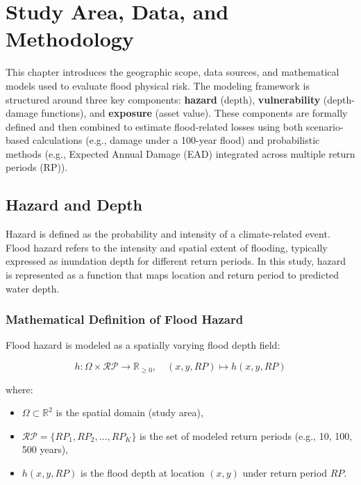 \chapter{Study Area, Data, and Methodology}

This chapter introduces the geographic scope, data sources, and mathematical models used to evaluate flood physical risk. The modeling framework is structured around three key components: \textbf{hazard} (depth), \textbf{vulnerability} (depth-damage functions), and \textbf{exposure} (asset value). These components are formally defined and then combined to estimate flood-related losses using both scenario-based calculations (e.g., damage under a 100-year flood) and probabilistic methods (e.g., Expected Annual Damage (EAD) integrated across multiple return periods (RP)).


\section{Hazard and Depth}
Hazard is defined as the probability and intensity of a climate-related event. Flood hazard refers to the intensity and spatial extent of flooding, typically expressed as inundation depth for different return periods. In this study, hazard is represented as a function that maps location and return period to predicted water depth.

\subsection{Mathematical Definition of Flood Hazard}

Flood hazard is modeled as a spatially varying flood depth field:

\begin{equation}
	h : \Omega \times \mathcal{RP} \rightarrow \mathbb{R}_{\geq 0}, \quad (x, y, RP) \mapsto h(x, y, RP)
	\label{eq:hazard-map}
\end{equation}

where:
\begin{itemize}
	\item \( \Omega \subset \mathbb{R}^2 \) is the spatial domain (study area),
	\item \( \mathcal{RP} = \{ RP_1, RP_2, \dots, RP_K \} \) is the set of modeled return periods (e.g., 10, 100, 500 years),
	\item \( h(x, y, RP) \) is the flood depth at location \( (x, y) \) under return period \( RP \).
\end{itemize}

